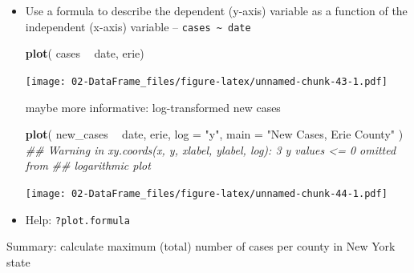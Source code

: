 \documentclass[
]{book}
\newenvironment{Shaded}{\begin{snugshade}}{\end{snugshade}}
\newcommand{\CommentTok}[1]{\textcolor[rgb]{0.56,0.35,0.01}{\textit{#1}}}
\newcommand{\DataTypeTok}[1]{\textcolor[rgb]{0.13,0.29,0.53}{#1}}
\newcommand{\KeywordTok}[1]{\textcolor[rgb]{0.13,0.29,0.53}{\textbf{#1}}}
\newcommand{\NormalTok}[1]{#1}
\newcommand{\OperatorTok}[1]{\textcolor[rgb]{0.81,0.36,0.00}{\textbf{#1}}}
\newcommand{\StringTok}[1]{\textcolor[rgb]{0.31,0.60,0.02}{#1}}
\begin{document}
\begin{itemize}
\item
  Use a formula to describe the dependent (y-axis) variable as a function of the independent (x-axis) variable -- \texttt{cases\ \textasciitilde{}\ date}

\begin{Shaded}
\begin{Highlighting}[]
\KeywordTok{plot}\NormalTok{( cases }\OperatorTok{~}\StringTok{ }\NormalTok{date, erie)}
\end{Highlighting}
\end{Shaded}

  \texttt{[image: 02-DataFrame\_files/figure-latex/unnamed-chunk-43-1.pdf]}

  maybe more informative: log-transformed new cases

\begin{Shaded}
\begin{Highlighting}[]
\KeywordTok{plot}\NormalTok{( new_cases }\OperatorTok{~}\StringTok{ }\NormalTok{date, erie, }\DataTypeTok{log =} \StringTok{"y"}\NormalTok{, }\DataTypeTok{main =} \StringTok{"New Cases, Erie County"}\NormalTok{ )}
\CommentTok{## Warning in xy.coords(x, y, xlabel, ylabel, log): 3 y values <= 0 omitted from}
\CommentTok{## logarithmic plot}
\end{Highlighting}
\end{Shaded}

  \texttt{[image: 02-DataFrame\_files/figure-latex/unnamed-chunk-44-1.pdf]}
\item
  Help: \texttt{?plot.formula}
\end{itemize}

Summary: calculate maximum (total) number of cases per county in New York state
\end{document}
